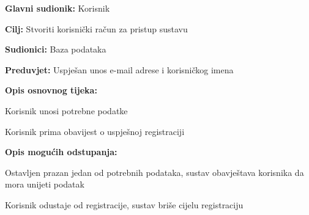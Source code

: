 					\noindent \label{UC2} 
					\begin{packed_item}
						
						\item \textbf{Glavni sudionik:} Korisnik
						\item  \textbf{Cilj:} Stvoriti korisnički račun za pristup sustavu
						\item  \textbf{Sudionici:} Baza podataka
						\item  \textbf{Preduvjet:} Uspješan unos e-mail adrese i korisničkog imena
						\item  \textbf{Opis osnovnog tijeka:}
						
						\item[] \begin{packed_enum}
							
							\item Korisnik unosi potrebne podatke
							\item Korisnik prima obavijest o uspješnoj registraciji
							
						\end{packed_enum}
						
						\item  \textbf{Opis mogućih odstupanja:}
						
						\item[] \begin{packed_item}
							
							\item[1.a] Ostavljen prazan jedan od potrebnih podataka, sustav obavještava korisnika da mora unijeti podatak
							\item[1.b] Korisnik odustaje od registracije, sustav briše cijelu registraciju
							
						\end{packed_item}
					\end{packed_item}
			

